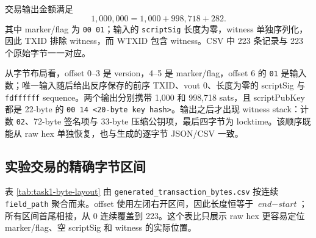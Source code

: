 \documentclass[11pt,a4paper,fontset=none]{ctexart}
\begin{document}
交易输出金额满足
\[
1{,}000{,}000 = 1{,}000 + 998{,}718 + 282.
\]
其中 marker/flag 为 \texttt{00 01}；输入的 \texttt{scriptSig} 长度为零，witness 单独序列化，因此 TXID 排除 witness，而 WTXID 包含 witness。CSV 中 223 条记录与 223 个原始字节一一对应。

从字节布局看，offset 0--3 是 version，4--5 是 marker/flag，offset 6 的 \texttt{01} 是输入数；唯一输入随后给出反序保存的前序 TXID、vout 0、长度为零的 scriptSig 与 \texttt{fdffffff} sequence。两个输出分别携带 1,000 和 998,718 sats，且 scriptPubKey 都是 22-byte 的 \texttt{00 14 <20-byte key hash>}。输出之后才出现 witness stack：计数 \texttt{02}、72-byte 签名项与 33-byte 压缩公钥项，最后四字节为 locktime。该顺序既能从 raw hex 单独恢复，也与生成的逐字节 JSON/CSV 一致。

\subsection{实验交易的精确字节区间}

表 \ref{tab:task1-byte-layout} 由 \texttt{generated\_transaction\_bytes.csv} 按连续 \texttt{field\_path} 聚合而来。offset 使用左闭右开区间，因此长度恒等于 $\textit{end}-\textit{start}$；所有区间首尾相接，从 0 连续覆盖到 223。这个表比只展示 raw hex 更容易定位 marker/flag、空 scriptSig 和 witness 的实际位置。
\end{document}
